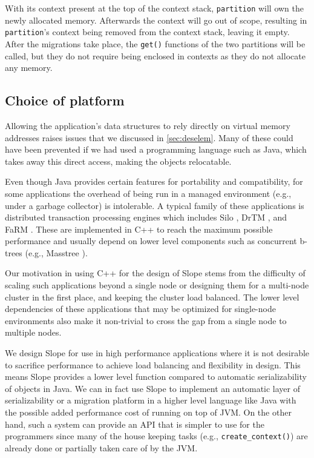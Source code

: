 With its context present at the top of
the context stack,
\texttt{partition} will own the newly allocated memory. Afterwards the context will
go out of scope, resulting in \texttt{partition}'s context being removed from the
context stack, leaving it empty. After the migrations take place, the \texttt{get()}
functions of the two partitions will be called, but they do not require
being enclosed in contexts as they do not allocate any memory.

\subsection{Choice of platform}
Allowing the application's data structures 
to rely directly on virtual memory addresses raises issues 
that we discussed in \ref{sec:deselem}. Many
of these could have been prevented if we had used a programming language such
as Java, which takes away this direct access, making the objects relocatable.

Even though Java provides certain features for portability and compatibility,
for some applications the overhead of being run in a managed environment
(e.g., under a garbage collector) is intolerable. A typical family of these
applications is distributed transaction
processing engines which includes Silo \cite{tu2013silo}, DrTM \cite{drtm2017},
and FaRM \cite{Dragojevic2014FaRM}. These are implemented in C++ to
reach the maximum possible performance and usually depend on lower level
components such as concurrent b-trees (e.g., Masstree \cite{mao2020masstree}).

Our motivation in using C++ for the design of Slope stems from the difficulty
of scaling such applications beyond a single node or designing them for a
multi-node cluster in the first place, and keeping the cluster load balanced.
The lower level dependencies of
these applications that may be optimized for single-node environments also
make it non-trivial to cross the gap from a single node to multiple nodes.

We design Slope for use in high performance applications where it is not
desirable to sacrifice performance to achieve load balancing and flexibility
in design. This means Slope provides a lower level function compared to
automatic serializability of objects in Java.
We can in fact use Slope to implement
an automatic layer of serializability or a migration platform in a higher
level language like Java with the possible added performance cost of running on
top of JVM. On the other hand, such a system can provide an API that is simpler
to use for the programmers since many of the house keeping tasks (e.g.,
\texttt{create\_context()}) are already done or partially taken care of by the JVM.


